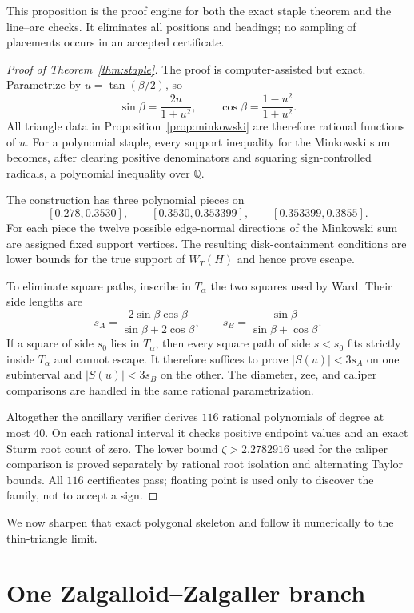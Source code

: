 \documentclass[11pt]{amsart}
\theoremstyle{remark}
\newcommand{\Q}{\mathbb Q}
\begin{document}
This proposition is the proof engine for both the exact staple theorem and
the line--arc checks.  It eliminates all positions and headings; no sampling
of placements occurs in an accepted certificate.

\begin{proof}[Proof of Theorem~\ref{thm:staple}]
The proof is computer-assisted but exact.  Parametrize by
$u=\tan(\beta/2)$, so
\[
 \sin\beta=\frac{2u}{1+u^2},
 \qquad
 \cos\beta=\frac{1-u^2}{1+u^2}.
\]
All triangle data in Proposition~\ref{prop:minkowski} are therefore rational
functions of $u$.  For a polynomial staple, every support inequality for
the Minkowski sum becomes, after clearing positive denominators and
squaring sign-controlled radicals, a polynomial inequality over $\Q$.

The construction has three polynomial pieces on
\[
 [0.278,0.3530],\qquad
 [0.3530,0.353399],\qquad
 [0.353399,0.3855].
\]
For each piece the twelve possible edge-normal directions of the Minkowski
sum are assigned fixed support vertices.  The resulting disk-containment
conditions are lower bounds for the true support of $W_T(H)$ and hence
prove escape.

To eliminate square paths, inscribe in $T_\alpha$ the two squares used by
Ward.  Their side lengths are
\[
 s_A=\frac{2\sin\beta\cos\beta}{\sin\beta+2\cos\beta},
 \qquad
 s_B=\frac{\sin\beta}{\sin\beta+\cos\beta}.
\]
If a square of side $s_0$ lies in $T_\alpha$, then every square path of side
$s<s_0$ fits strictly inside $T_\alpha$ and cannot escape.  It therefore
suffices to prove $|S(u)|<3s_A$ on one subinterval and
$|S(u)|<3s_B$ on the other.  The diameter, zee, and caliper comparisons are
handled in the same rational parametrization.

Altogether the ancillary verifier derives $116$ rational polynomials of
degree at most $40$.  On each rational interval it checks positive endpoint
values and an exact Sturm root count of zero.  The lower bound
$\zeta>2.2782916$ used for the caliper comparison is proved separately by
rational root isolation and alternating Taylor bounds.  All $116$
certificates pass; floating point is used only to discover the family, not
to accept a sign.
\end{proof}

We now sharpen that exact polygonal skeleton and follow it numerically to the
thin-triangle limit.

\section{One Zalgalloid--Zalgaller branch}\label{sec:branch}
\end{document}
